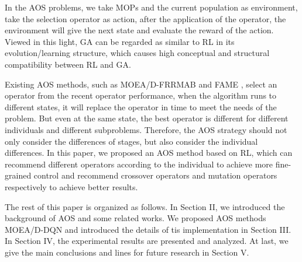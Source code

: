 \documentclass[journal]{IEEEtran}
\begin{document}
In the AOS problems, we take MOPs and the current population as environment, take the selection operator as action, after the application of the operator, the environment will give the next state and evaluate the reward of the action.
Viewed in this light, GA can be regarded as similar to RL in its evolution/learning structure, which causes high conceptual and structural compatibility between RL and GA.

Existing AOS methods, such as MOEA/D-FRRMAB \cite{frrmab} and FAME \cite{fame}, select an operator from the recent operator performance, when the algorithm runs to different states, it will replace the operator in time to meet the needs of the problem.
But even at the same state, the best operator is different for different individuals and different subproblems. Therefore, the AOS strategy should not only consider the differences of stages, but also consider the individual differences.
In this paper, we proposed an AOS method based on RL, which can recommend different operators according to the individual to achieve more fine-grained control and recommend crossover operators and mutation operators respectively to achieve better results.

The rest of this paper is organized as follows. In Section II, we introduced the background of AOS and some related works. We proposed AOS methods MOEA/D-DQN and introduced the details of tis implementation in Section III. In Section IV, the experimental results are presented and analyzed. At last, we give the main conclusions and lines for future research in Section V.
\end{document}
